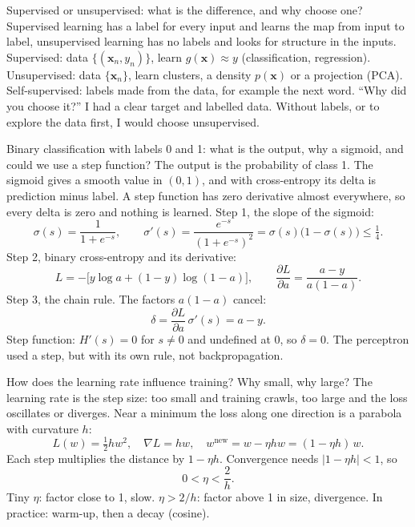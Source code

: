 \begin{qabox}[Defense]{\asked Supervised or unsupervised: what is the difference, and why choose one?}
\ans Supervised learning has a label for every input and learns the map from input to label, unsupervised
learning has no labels and looks for structure in the inputs.
\formula Supervised: data $\{(\mathbf{x}_n,y_n)\}$, learn $g(\mathbf{x})\approx y$ (classification, regression).
Unsupervised: data $\{\mathbf{x}_n\}$, learn clusters, a density $p(\mathbf{x})$ or a projection (PCA).
Self-supervised: labels made from the data, for example the next word.
\follow ``Why did you choose it?'' I had a clear target and labelled data. Without labels, or to explore the data
first, I would choose unsupervised.
\end{qabox}

\begin{qabox}[Schlüter]{\asked Binary classification with labels 0 and 1: what is the output, why a sigmoid, and could we use a step function?}
\ans The output is the probability of class 1. The sigmoid gives a smooth value in $(0,1)$, and with
cross-entropy its delta is prediction minus label. A step function has zero derivative almost everywhere, so
every delta is zero and nothing is learned.
\formula Step 1, the slope of the sigmoid:
\[ \sigma(s)=\frac{1}{1+e^{-s}},\qquad \sigma'(s)=\frac{e^{-s}}{(1+e^{-s})^2}=\sigma(s)\bigl(1-\sigma(s)\bigr)\le\tfrac14 . \]
Step 2, binary cross-entropy and its derivative:
\[ L=-\bigl[y\log a+(1-y)\log(1-a)\bigr],\qquad \frac{\partial L}{\partial a}=\frac{a-y}{a(1-a)} . \]
Step 3, the chain rule. The factors $a(1-a)$ cancel:
\[ \delta=\frac{\partial L}{\partial a}\,\sigma'(s)=a-y . \]
Step function: $H'(s)=0$ for $s\ne0$ and undefined at $0$, so $\delta=0$. The perceptron used a step, but with its
own rule, not backpropagation.
\end{qabox}

\begin{qabox}[Schlüter]{\asked How does the learning rate influence training? Why small, why large?}
\ans The learning rate is the step size: too small and training crawls, too large and the loss oscillates or
diverges.
\formula Near a minimum the loss along one direction is a parabola with curvature $h$:
\[ L(w)=\tfrac12 h w^2,\quad \nabla L=hw,\quad w^{\text{new}}=w-\eta h w=(1-\eta h)\,w . \]
Each step multiplies the distance by $1-\eta h$. Convergence needs $|1-\eta h|<1$, so
\[ 0<\eta<\frac{2}{h}. \]
Tiny $\eta$: factor close to 1, slow. $\eta>2/h$: factor above 1 in size, divergence. In practice: warm-up, then
a decay (cosine).
\end{qabox}

